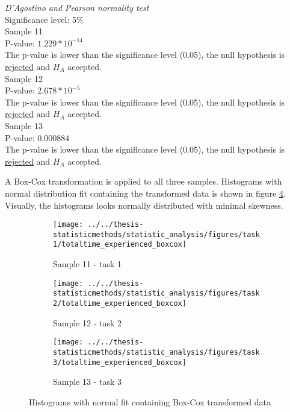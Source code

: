   \begin{center}
 	\begin{tcolorbox}[box align=center,width=\textwidth-5cm]
 		\centering
 		\textit{D'Agostino and Pearson normality test}\\
 		Significance level: 5\%  \\[0.5cm]
 		
 		Sample 11 \\
 		P-value: $1.229 * 10^{-14}$\\
 		The p-value is lower than the significance level (0.05), the null hypothesis is \underline{rejected} and $H_A$ accepted.\\[0.5cm]
 		
 		Sample 12 \\
 		P-value: $2.678 * 10^{-5}$ \\
		The p-value is lower than the significance level (0.05), the null hypothesis is \underline{rejected} and $H_A$ accepted.\\[0.5cm]
 		
 		Sample 13 \\
 		P-value: $0.000884$ \\
 		The p-value is lower than the significance level (0.05), the null hypothesis is \underline{rejected} and $H_A$ accepted.\\[0.5cm]
 	\end{tcolorbox} 
 \end{center}

A Box-Cox transformation is applied to all three samples. Histograms with normal distribution fit containing the transformed data is shown in figure \ref{fig:sample11_12_13_boxcox_histogram}. Visually, the histograms looks normally distributed with minimal skewness. \\

\begin{figure}[H]
	\centering
	\begin{subfigure}[b]{0.32\textwidth}
		\centering
		\texttt{[image: ../../thesis-statisticmethods/statistic\_analysis/figures/task1/totaltime\_experienced\_boxcox]}
		\caption{Sample 11 - task 1}
		\label{fig:totaltimeexperiencedboxcox_task1}
	\end{subfigure}
	\begin{subfigure}[b]{0.32\textwidth}
		\centering
		\texttt{[image: ../../thesis-statisticmethods/statistic\_analysis/figures/task2/totaltime\_experienced\_boxcox]}
		\caption{Sample 12 - task 2}
		\label{fig:totaltimeexperiencedboxcox_task2}
	\end{subfigure}
	\begin{subfigure}[b]{0.32\textwidth}
		\centering
		\texttt{[image: ../../thesis-statisticmethods/statistic\_analysis/figures/task3/totaltime\_experienced\_boxcox]}
		\caption{Sample 13 - task 3}
		\label{fig:totaltimeexperiencedboxcox_task3}
	\end{subfigure}
	\caption{Histograms with normal fit containing Box-Cox transformed data}
	\label{fig:sample11_12_13_boxcox_histogram}
\end{figure}

